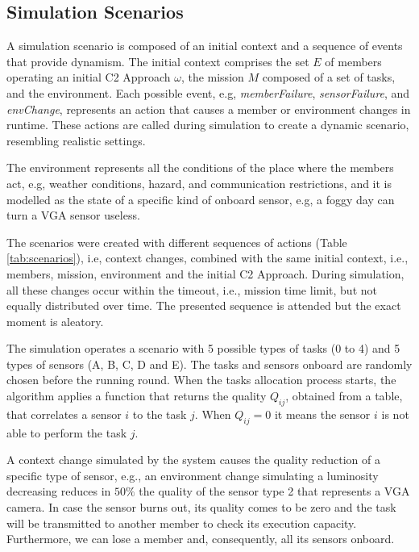 \subsection{Simulation Scenarios}
\label{sub:scenarios}

A simulation scenario is composed of an initial context and a sequence of events that provide dynamism. The initial context comprises the set $E$ of members operating an initial C2 Approach $\omega$, the mission $M$ composed of a set of tasks, and the environment. Each possible event, e.g, \textit{memberFailure}, \textit{sensorFailure}, and \textit{envChange}, represents an action that causes a member or environment changes in runtime. These actions are called during simulation to create a dynamic scenario, resembling realistic settings.

The environment represents all the conditions of the place where the members act, e.g, weather conditions, hazard, and communication restrictions, and it is modelled as the state of a specific kind of onboard sensor, e.g, a foggy day can turn a VGA sensor useless.

The scenarios were created with different sequences of actions (Table \ref{tab:scenarios}), i.e, context changes, combined with the same initial context, i.e., members, mission, environment and the initial C2 Approach. During simulation, all these changes occur within the timeout, i.e., mission time limit, but not equally distributed over time. The presented sequence is attended but the exact moment is aleatory.



The simulation operates a scenario with 5 possible types of tasks (0 to 4) and 5 types of sensors (A, B, C, D and E). The tasks and sensors onboard are randomly chosen before the running round. When the tasks allocation process starts, the algorithm applies a function that returns the quality $Q_{ij}$, obtained from a table, that correlates a sensor $i$ to the task $j$. When $Q_{ij}=0$ it means the sensor $i$ is not able to perform the task $j$.

A context change simulated by the system causes the quality reduction of a specific type of sensor, e.g., an environment change simulating a luminosity decreasing reduces in $50\%$ the quality of the sensor type 2 that represents a VGA camera. In case the sensor burns out, its quality comes to be zero and the task will be transmitted to another member to check its execution capacity. Furthermore, we can lose a member and, consequently, all its sensors onboard.

